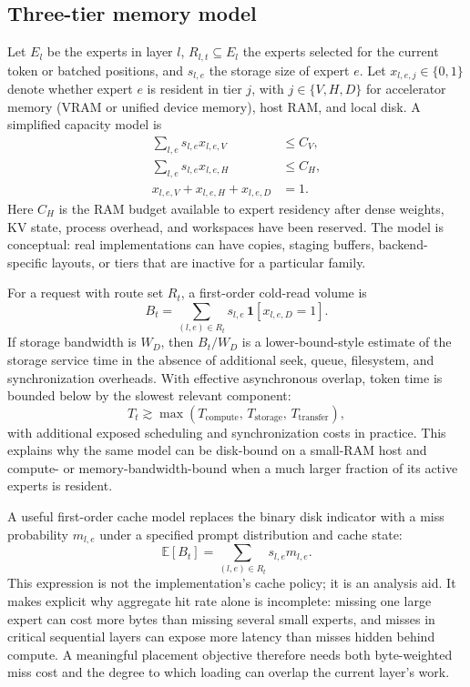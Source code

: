 \documentclass[10pt,twocolumn]{article}
\begin{document}
\subsection{Three-tier memory model}
Let $E_l$ be the experts in layer $l$, $R_{l,t}\subseteq E_l$ the experts selected for the current token or batched positions, and $s_{l,e}$ the storage size of expert $e$. Let $x_{l,e,j}\in\{0,1\}$ denote whether expert $e$ is resident in tier $j$, with $j\in\{V,H,D\}$ for accelerator memory (VRAM or unified device memory), host RAM, and local disk. A simplified capacity model is
\begin{align}
\sum_{l,e} s_{l,e}x_{l,e,V} &\le C_V,\\
\sum_{l,e} s_{l,e}x_{l,e,H} &\le C_H,\\
x_{l,e,V}+x_{l,e,H}+x_{l,e,D} &= 1.
\end{align}
Here $C_H$ is the RAM budget available to expert residency after dense weights, KV state, process overhead, and workspaces have been reserved. The model is conceptual: real implementations can have copies, staging buffers, backend-specific layouts, or tiers that are inactive for a particular family.

For a request with route set $R_t$, a first-order cold-read volume is
\begin{equation}
B_t = \sum_{(l,e)\in R_t} s_{l,e}\,\mathbf{1}[x_{l,e,D}=1].
\end{equation}
If storage bandwidth is $W_D$, then $B_t/W_D$ is a lower-bound-style estimate of the storage service time in the absence of additional seek, queue, filesystem, and synchronization overheads. With effective asynchronous overlap, token time is bounded below by the slowest relevant component:
\begin{equation}
T_t \gtrsim \max(T_{\mathrm{compute}},\,T_{\mathrm{storage}},\,T_{\mathrm{transfer}}),
\end{equation}
with additional exposed scheduling and synchronization costs in practice. This explains why the same model can be disk-bound on a small-RAM host and compute- or memory-bandwidth-bound when a much larger fraction of its active experts is resident.


A useful first-order cache model replaces the binary disk indicator with a miss probability $m_{l,e}$ under a specified prompt distribution and cache state:
\begin{equation}
\mathbb{E}[B_t] = \sum_{(l,e)\in R_t} s_{l,e} m_{l,e}.
\end{equation}
This expression is not the implementation's cache policy; it is an analysis aid. It makes explicit why aggregate hit rate alone is incomplete: missing one large expert can cost more bytes than missing several small experts, and misses in critical sequential layers can expose more latency than misses hidden behind compute. A meaningful placement objective therefore needs both byte-weighted miss cost and the degree to which loading can overlap the current layer's work.
\end{document}

